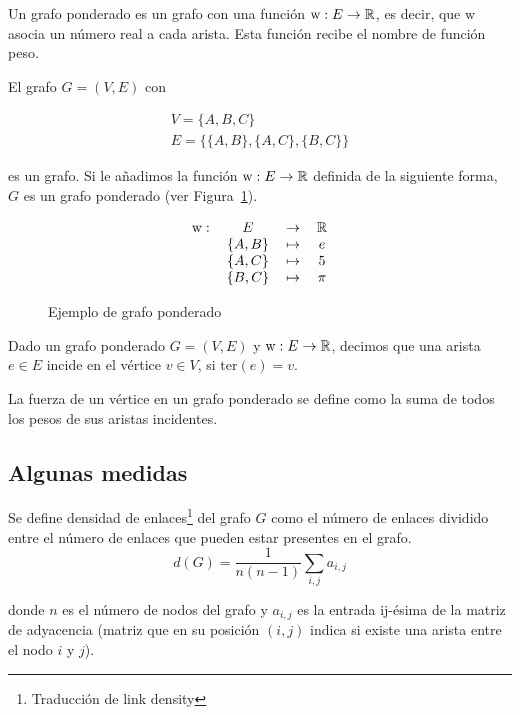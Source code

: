 \begin{defi}
	Un grafo ponderado es un grafo con una función $\mathrm{w} : E \to \mathbb{R}$, es decir, que $\mathrm{w}$ asocia un número real a cada arista. Esta función recibe el nombre de función peso.
\end{defi}

\begin{ejemplo}
	El grafo $G = (V,E)$ con 
	
	\begin{eqnarray}
	V = \{A, B, C\}\\
	E = \{ \{A,B\}, \{A,C\}, \{B,C\} \}
	\end{eqnarray} 
	
	es un grafo. Si le añadimos la función $\mathrm{w} : E \to \mathbb{R}$ definida de la siguiente forma, $G$ es un grafo ponderado (ver Figura~\ref{fig:grafo_ponderado}).
	
	\begin{equation*}
	\begin{tabular}{r c c c}
	$\mathrm{w}:$ & $E$ & $\to$ & $\R$\\
	& $\{A,B\}$ & $\mapsto$ & $e$\\
	& $\{A,C\}$ & $\mapsto$ & $5$\\
	& $\{B,C\}$ & $\mapsto$ & $\pi$
	
	\end{tabular}
	\end{equation*}
	\begin{figure}[htb]
		\centering
		\ejemplografoponderado
		\caption{Ejemplo de grafo ponderado}
		\label{fig:grafo_ponderado}
	\end{figure} 
\end{ejemplo}

\begin{defi}
	Dado un grafo ponderado $G = (V,E)$ y $\mathrm{w} : E \to \mathbb{R}$, decimos que una arista $e \in E$ incide en el vértice $v \in V$, si $\mathrm{ter}(e) = v$. 
\end{defi}

\begin{defi}
	La fuerza de un vértice en un grafo ponderado se define como la suma de todos los pesos de sus aristas incidentes.
\end{defi}

\subsection{Algunas medidas}\label{sec:medidas}

\begin{defi}
	Se define densidad de enlaces\footnote{Traducción de link density} del grafo $G$ como el número de enlaces dividido entre el número de enlaces que pueden estar presentes en el grafo.
	\begin{equation}\label{eq:densidad}
	d(G) = \dfrac{1}{n(n-1)} \sum_{i,j} a_{i,j}
	\end{equation}
	
	donde $n$ es el número de nodos del grafo y $a_{i,j}$ es la entrada ij-ésima de la matriz de adyacencia (matriz que en su posición $(i,j)$ indica si existe una arista entre el nodo $i$ y $j$).
\end{defi}

